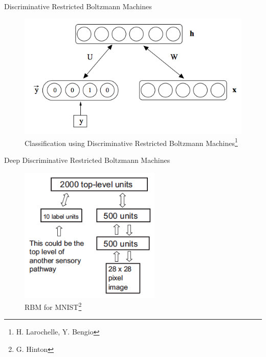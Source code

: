 \documentclass[10pt]{beamer}
\begin{document}
\begin{frame}{Discriminative Restricted Boltzmann Machines}

\begin{figure}[h!]
  \centering
  \includegraphics[width=1\textwidth]{images/drbm.png}
  \caption{Classification using Discriminative Restricted Boltzmann Machines\footnote{H. Larochelle, Y. Bengio}}
\end{figure}

\end{frame}


\begin{frame}{Deep Discriminative Restricted Boltzmann Machines}

\begin{figure}[h!]
  \centering
  \includegraphics[width=0.6\textwidth]{images/ddrbm.png}
  \caption{RBM for MNIST\footnote{G. Hinton}}
\end{figure}

\end{frame}
\end{document}
